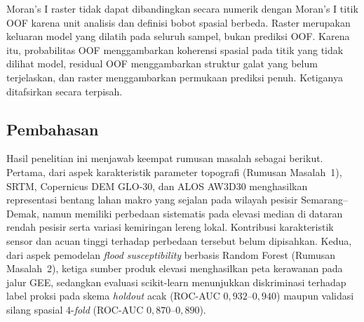 \documentclass[12pt]{article}
\begin{document}
Moran's I raster tidak dapat dibandingkan secara numerik dengan Moran's I
titik OOF karena unit analisis dan definisi bobot spasial berbeda. Raster
merupakan keluaran model yang dilatih pada seluruh sampel, bukan prediksi OOF.
Karena itu, probabilitas OOF menggambarkan koherensi spasial pada titik yang
tidak dilihat model, residual OOF menggambarkan struktur galat yang belum
terjelaskan, dan raster menggambarkan permukaan prediksi penuh. Ketiganya
ditafsirkan secara terpisah.

\subsection{Pembahasan}
\label{ssec:pembahasan}

Hasil penelitian ini menjawab keempat rumusan masalah sebagai berikut.
Pertama, dari
aspek karakteristik parameter topografi (Rumusan Masalah~1), SRTM, Copernicus
DEM GLO-30, dan ALOS AW3D30 menghasilkan representasi bentang lahan makro yang
sejalan pada wilayah pesisir Semarang--Demak, namun memiliki perbedaan
sistematis pada elevasi median di dataran rendah pesisir serta variasi
kemiringan lereng lokal. Kontribusi karakteristik sensor dan acuan tinggi
terhadap perbedaan tersebut belum dipisahkan. Kedua, dari aspek pemodelan \textit{flood
susceptibility} berbasis Random Forest (Rumusan Masalah~2), ketiga sumber
produk elevasi menghasilkan peta kerawanan pada jalur GEE, sedangkan
evaluasi scikit-learn menunjukkan diskriminasi terhadap label proksi
pada skema \textit{holdout} acak
(ROC-AUC $0{,}932$--$0{,}940$) maupun validasi silang spasial 4-\textit{fold}
(ROC-AUC $0{,}870$--$0{,}890$).
\end{document}
